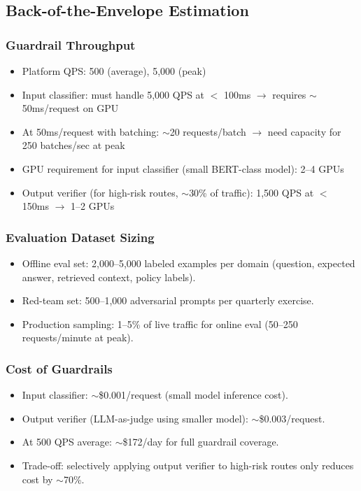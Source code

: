 \subsection*{Back-of-the-Envelope Estimation}

\subsubsection*{Guardrail Throughput}

\begin{itemize}
  \item Platform QPS: 500 (average), 5,000 (peak)
  \item Input classifier: must handle 5,000 QPS at $<$ 100ms $\rightarrow$ requires $\sim$50ms/request on GPU
  \item At 50ms/request with batching: $\sim$20 requests/batch $\rightarrow$ need capacity for 250 batches/sec at peak
  \item GPU requirement for input classifier (small BERT-class model): 2--4 GPUs
  \item Output verifier (for high-risk routes, $\sim$30\% of traffic): 1,500 QPS at $<$ 150ms $\rightarrow$ 1--2 GPUs
\end{itemize}

\subsubsection*{Evaluation Dataset Sizing}

\begin{itemize}
  \item Offline eval set: 2,000--5,000 labeled examples per domain (question, expected answer, retrieved context, policy labels).
  \item Red-team set: 500--1,000 adversarial prompts per quarterly exercise.
  \item Production sampling: 1--5\% of live traffic for online eval (50--250 requests/minute at peak).
\end{itemize}

\subsubsection*{Cost of Guardrails}

\begin{itemize}
  \item Input classifier: $\sim$\$0.001/request (small model inference cost).
  \item Output verifier (LLM-as-judge using smaller model): $\sim$\$0.003/request.
  \item At 500 QPS average: $\sim$\$172/day for full guardrail coverage.
  \item Trade-off: selectively applying output verifier to high-risk routes only reduces cost by $\sim$70\%.
\end{itemize}

